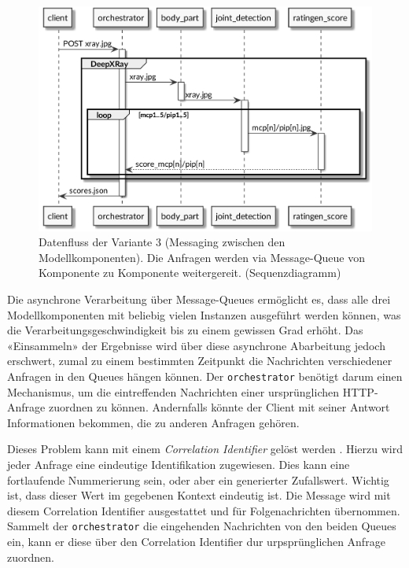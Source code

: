 \begin{figure}[tbh]
    \centering
    \includegraphics[width=\linewidth]{pics/datenfluss-variante-queue-1.png}
    \caption{Datenfluss der Variante 3 (Messaging zwischen den Modellkomponenten). Die Anfragen werden via Message-Queue von Komponente zu Komponente weitergereit. (Sequenzdiagramm)}
    \label{fig:datenfluss-variante-queue-1}
\end{figure}

Die asynchrone Verarbeitung über Message-Queues ermöglicht es, dass alle drei Modellkomponenten mit beliebig vielen Instanzen ausgeführt werden können, was die Verarbeitungsgeschwindigkeit bis zu einem gewissen Grad erhöht. Das «Einsammeln» der Ergebnisse wird über diese asynchrone Abarbeitung jedoch erschwert, zumal zu einem bestimmten Zeitpunkt die Nachrichten verschiedener Anfragen in den Queues hängen können. Der \texttt{orchestrator} benötigt darum einen Mechanismus, um die  eintreffenden Nachrichten einer ursprünglichen HTTP-Anfrage zuordnen zu können. Andernfalls könnte der Client mit seiner Antwort Informationen bekommen, die zu anderen Anfragen gehören.

Dieses Problem kann mit einem \textit{Correlation Identifier} gelöst werden \cite[S. 163-169]{enterprise-integration-patterns}. Hierzu wird jeder Anfrage eine eindeutige Identifikation zugewiesen. Dies kann eine fortlaufende Nummerierung sein, oder aber ein generierter Zufallswert. Wichtig ist, dass dieser Wert im gegebenen Kontext eindeutig ist. Die Message wird mit diesem Correlation Identifier ausgestattet und für Folgenachrichten übernommen. Sammelt der \texttt{orchestrator} die eingehenden Nachrichten von den beiden Queues ein, kann er diese über den Correlation Identifier dur urpsprünglichen Anfrage zuordnen.

